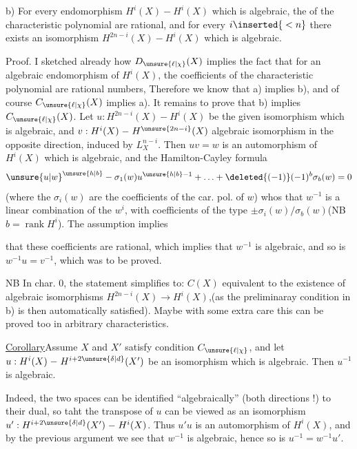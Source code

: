 b) For every endomorphism $H^i(X)\mathrel{-}H^i(X)$ which is algebraic, the  of the characteristic polynomial are rational, and for every $i\inserted{{}<n}$ there exists an isomorphism $H^{2n-i}(X)\mathrel{-}H^i(X)$ which is algebraic.

Proof. I sketched already how $D_{\unsure{\ell|\chi}}(X)$ implies the fact that for an algebraic endomorphism of $H^i(X)$, the coefficients of the characteristic polynomial are rational numbers, Therefore we know that a) implies b), and of course $C_{\unsure{\ell|\chi}}(X)$ implies a). It remains to prove that b) implies $C_{\unsure{\ell|\chi}}(X)$. Let $u:H^{2n-i}(X)\mathrel{-}H^i(X)$ be the given isomorphism which is algebraic, and $v:H^i(X)\mathrel{-}H^{\unsure{2n-i}}(X)$  algebraic isomorphism in the opposite direction, induced by $L_X^{n-i}$. Then $uv=w$ is an automorphism of $H^i(X)$ which is algebraic, and the Hamilton-Cayley formula
\[
\unsure{u|w}^{\unsure{h|b}}-\sigma_1(w)u^{\unsure{h|b}-1}+\ldots+\deleted{(-1)}(-1)^b\sigma_b(w)=0
\]
(where the $\sigma_i(w)$ are the coefficients of the car. pol. of $w$) whos that $w^{-1}$ is a linear combination of the $w^i$, with coefficients of the type $\pm\sigma_i(w)/\sigma_b(w)$\quad (NB $b=\operatorname{rank}H^i$). The assumption implies



that these coefficients are rational, which implies that $w^{-1}$ is algebraic, and so is $w^{-1}u=v^{-1}$, which was to be proved.

NB In char. 0,  the statement simplifies to: $C(X)$ equivalent to the existence of algebraic isomorphisms $H^{2n-i}(X)\to H^i(X)$,(as the preliminaray condition in b) is then automatically satisfied). Maybe with some extra care this can be proved too in arbitrary characteristics.

\uline{Corollary}\quad Assume $X$ and $X'$ satisfy condition $C_{\unsure{\ell|\chi}}$, and let $u:H^i(X)\mathrel{-}H^{i+2\unsure{\delta|d}}(X')$  be an isomorphism which is algebraic. Then $u^{-1}$ is algebraic.

Indeed, the two spaces can be identified ``algebraically'' (both directions !) to their dual, so taht the transpose of $u$ can be viewed as an isomorphism $u':H^{i+2\unsure{\delta|d}}(X')\mathrel{-}H^i(X)$. Thus $u'u$ is an  automorphism  of $H^i(X)$, and by the previous argument we see that $w^{-1}$ is algebraic, hence so is $u^{-1}=w^{-1}u'$.

